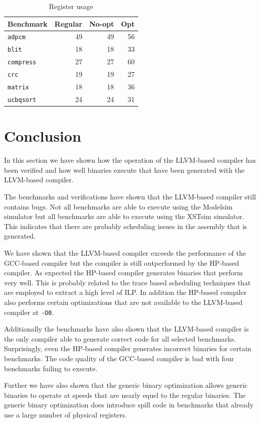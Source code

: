 \begin{table}
  \centering
    \begin{tabular}{|l|r|r|r|}
    \hline
    \textbf{Benchmark} & \multicolumn{1}{|r|}{\textbf{Regular}} & \multicolumn{1}{|r|}{\textbf{No-opt}} & \multicolumn{1}{|r|}{\textbf{Opt}} \\ \hline
	\texttt{adpcm} 		&   49  &	49 & 	56 \\ \hline
	\texttt{blit} 		&   18  &	18 & 	33 \\ \hline
	\texttt{compress} 	&   27  &	27 & 	60 \\ \hline
	\texttt{crc} 		&   19  &	19 & 	27 \\ \hline
	\texttt{matrix} 	&   18 	&	18 & 	36 \\ \hline
	\texttt{ucbqsort} 	&   24  &	24 & 	31 \\ \hline
    \end{tabular}
  \caption{Register usage}
  \label{tbl:gen_regs}
\end{table}

\section{Conclusion}
In this section we have shown how the operation of the LLVM-based compiler has been verified and how well binaries execute that have been generated with the LLVM-based compiler.

The benchmarks and verifications have shown that the LLVM-based compiler still contains bugs. Not all benchmarks are able to execute using the Modelsim simulator but all benchmarks are able to execute using the XSTsim simulator. This indicates that there are probably scheduling issues in the assembly that is generated.

We have shown that the LLVM-based compiler exceeds the performance of the GCC-based compiler but the compiler is still outperformed by the HP-based compiler. As expected the HP-based compiler generates binaries that perform very well. This is probably related to the trace based scheduling techniques that are employed to extract a high level of ILP. In addition the HP-based compiler also performs certain optimizations that are not available to the LLVM-based compiler at \texttt{-O0}.

Additionally the benchmarks have also shown that the LLVM-based compiler is the only compiler able to generate correct code for all selected benchmarks. Surprisingly, even the HP-based compiler generates incorrect binaries for certain benchmarks. The code quality of the GCC-based compiler is bad with four benchmarks failing to execute.

Further we have also shown that the generic binary optimization allows generic binaries to operate at speeds that are nearly equel to the regular binaries. The generic binary optimization does introduce spill code in benchmarks that already use a large number of physical registers.
\acresetall
